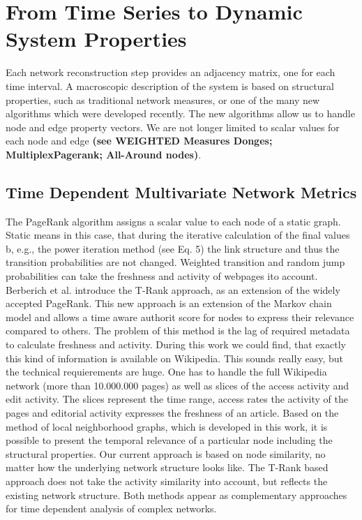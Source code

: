 \documentclass[a4paper,10pt]{scrbook}
\begin{document}
\section{From Time Series to Dynamic System Properties}
Each network reconstruction step provides an adjacency matrix, one for each time interval. A macroscopic description of the system is based on structural properties, such as traditional network measures, or one of the many new algorithms which were developed recently. The new algorithms allow us to handle node and edge property vectors. We are not longer limited to scalar values for each node and edge \textbf{(see WEIGHTED Measures Donges; MultiplexPagerank; All-Around nodes)}. 

\subsection{Time Dependent Multivariate Network Metrics }
 

\cite{Halu2013}

% 
The PageRank algorithm assigns a scalar value to each node of a static graph. Static means in this case, that during the iterative calculation of the final values b, e.g.,  the power iteration method (see \cite{Berberich04} Eq. 5) the link structure and thus the transition probabilities are not changed. Weighted transition and random jump probabilities can take the freshness and activity of webpages ito account. Berberich et al. introduce the T-Rank approach, as an extension of the widely accepted PageRank. This new approach is an extension of the Markov chain model and allows a time aware authorit score for nodes to express their relevance compared to others. The problem of this method is the lag of required metadata to calculate freshness and activity. During this work we could find, that exactly this kind of information is available on Wikipedia. This sounds really easy, but the technical requierements are huge. One has to handle the full Wikipedia network (more than 10.000.000 pages) as well as slices of the access activity and edit activity. The slices represent the time range, access rates the activity of the pages and editorial activity expresses the freshness of an article. Based on the method of local neighborhood graphs, which is developed in this work, it is possible to present the temporal relevance of a particular node including the structural properties. Our current approach is based on node similarity, no matter how the underlying network structure looks like. The T-Rank based approach does not take the activity similarity into account, but reflects the existing network structure. Both methods appear as complementary approaches for time dependent analysis of complex networks. 
\end{document}
